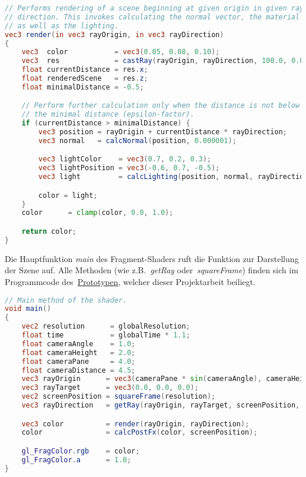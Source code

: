 \begin{minipage}{\linewidth}
\begin{lstlisting}[language=GLSL,caption={Funktion zur Darstellung der
        Szene in
        GLSL. Die Szene bzw.\ der Farbwert wird nur dann zurückgegeben
        bzw.\ berechnet, wenn eine minimale Distanz nicht unterschritten
        wird.},label={alg:glsl_render},captionpos=b,emph={render}]
// Performs rendering of a scene beginning at given origin in given ray
// direction. This invokes calculating the normal vector, the material
// as well as the lighting.
vec3 render(in vec3 rayOrigin, in vec3 rayDirection)
{
    vec3  color           = vec3(0.05, 0.08, 0.10);
    vec3  res             = castRay(rayOrigin, rayDirection, 100.0, 0.00001, 100);
    float currentDistance = res.x;
    float renderedScene   = res.z;
    float minimalDistance = -0.5;

    // Perform further calculation only when the distance is not below
    // the minimal distance (epsilon-factor).
    if (currentDistance > minimalDistance) {
        vec3 position = rayOrigin + currentDistance * rayDirection;
        vec3 normal   = calcNormal(position, 0.000001);

        vec3 lightColor    = vec3(0.7, 0.2, 0.3);
        vec3 lightPosition = vec3(-0.6, 0.7, -0.5);
        vec3 light         = calcLighting(position, normal, rayDirection, material, lightPosition, lightColor);

        color = light;
    }
    color      = clamp(color, 0.0, 1.0);

    return color;
}
\end{lstlisting}
\end{minipage}

Die Hauptfunktion \textit{main} des Fragment-Shaders ruft die Funktion
zur Darstellung der Szene auf. Alle Methoden (wie z.B.~\textit{getRay}
oder~\textit{squareFrame}) finden sich im Programmcode
des~\hyperref[chap:prototype]{Prototypen}, welcher dieser Projektarbeit
beiliegt.

\begin{minipage}{\linewidth}
\begin{lstlisting}[language=GLSL,caption={Einstiegspunkt des
        Fragment-Shaders.},
    label={alg:glsl_main},captionpos=b,emph={main}]
// Main method of the shader.
void main()
{
    vec2 resolution      = globalResolution;
    float time           = globalTime * 1.1;
    float cameraAngle    = 1.0;
    float cameraHeight   = 2.0;
    float cameraPane     = 4.0;
    float cameraDistance = 4.5;
    vec3 rayOrigin      = vec3(cameraPane * sin(cameraAngle), cameraHeight, cameraDistance * cos(cameraAngle * time));
    vec3 rayTarget      = vec3(0.0, 0.0, 0.0);
    vec2 screenPosition = squareFrame(resolution);
    vec3 rayDirection   = getRay(rayOrigin, rayTarget, screenPosition, 2.0);

    vec3 color          = render(rayOrigin, rayDirection);
    color               = calcPostFx(color, screenPosition);

    gl_FragColor.rgb    = color;
    gl_FragColor.a      = 1.0;
}
\end{lstlisting}
\end{minipage}

